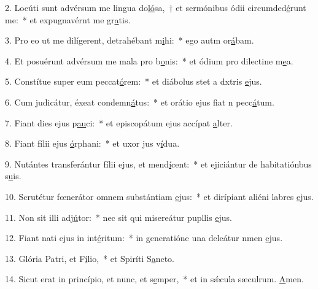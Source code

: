 2. Locúti sunt advérsum me lingua do\uline{ló}sa,~† et sermónibus ódii circumded\uline{é}runt me:~* et expugnavérnt me gr\uline{a}tis.\par 
3. Pro eo ut me dilígerent, detrahébant m\uline{i}hi:~* ego autm or\uline{á}bam.\par 
4. Et posuérunt advérsum me mala pro b\uline{o}nis:~* et ódium pro dilectine m\uline{e}a.\par 
5. Constítue super eum peccat\uline{ó}rem:~* et diábolus stet a dxtris \uline{e}jus.\par 
6. Cum judicátur, éxeat condemn\uline{á}tus:~* et orátio ejus fiat n pecc\uline{á}tum.\par 
7. Fiant dies ejus p\uline{au}ci:~* et episcopátum ejus accípat \uline{a}lter.\par 
8. Fiant fílii ejus \uline{ó}rphani:~* et uxor jus v\uline{í}dua.\par 
9. Nutántes transferántur fílii ejus, et mend\uline{í}cent:~* et ejiciántur de habitatiónbus s\uline{u}is.\par 
10. Scrutétur fœnerátor omnem substántiam \uline{e}jus:~* et dirípiant aliéni labres \uline{e}jus.\par 
11. Non sit illi adj\uline{ú}tor:~* nec sit qui misereátur pupllis \uline{e}jus.\par 
12. Fiant nati ejus in int\uline{é}ritum:~* in generatióne una deleátur nmen \uline{e}jus.\par 
13. Glória Patri, et F\uline{í}lio,~* et Spiríti S\uline{a}ncto.\par 
14. Sicut erat in princípio, et nunc, et s\uline{e}mper,~* et in sǽcula sæculrum. \uline{A}men.\par 
